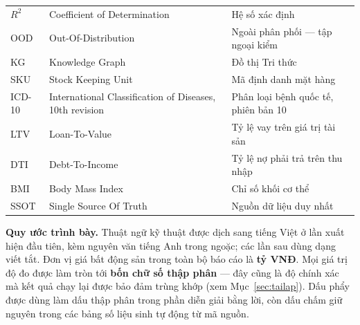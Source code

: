 \begin{longtable}{@{}L{2.4cm}L{5.0cm}L{6.4cm}@{}}
$R^2$     & Coefficient of Determination  & Hệ số xác định \\
OOD       & Out-Of-Distribution           & Ngoài phân phối --- tập ngoại kiểm \\
KG        & Knowledge Graph               & Đồ thị Tri thức \\
SKU       & Stock Keeping Unit            & Mã định danh mặt hàng \\
ICD-10    & International Classification of Diseases, 10th revision & Phân loại bệnh quốc tế, phiên bản 10 \\
LTV       & Loan-To-Value                 & Tỷ lệ vay trên giá trị tài sản \\
DTI       & Debt-To-Income                & Tỷ lệ nợ phải trả trên thu nhập \\
BMI       & Body Mass Index               & Chỉ số khối cơ thể \\
SSOT      & Single Source Of Truth        & Nguồn dữ liệu duy nhất \\
\end{longtable}

\bigskip
\noindent\textbf{Quy ước trình bày.} Thuật ngữ kỹ thuật được dịch sang tiếng
Việt ở lần xuất hiện đầu tiên, kèm nguyên văn tiếng Anh trong ngoặc; các lần
sau dùng dạng viết tắt. Đơn vị giá bất động sản trong toàn bộ báo cáo là
\textbf{tỷ VNĐ}. Mọi giá trị độ đo được làm tròn tới \textbf{bốn chữ số thập
phân} --- đây cũng là độ chính xác mà kết quả chạy lại được bảo đảm trùng khớp
(xem Mục~\ref{sec:tailap}). Dấu phẩy được dùng làm dấu thập phân trong phần
diễn giải bằng lời, còn dấu chấm giữ nguyên trong các bảng số liệu sinh tự động
từ mã nguồn.

